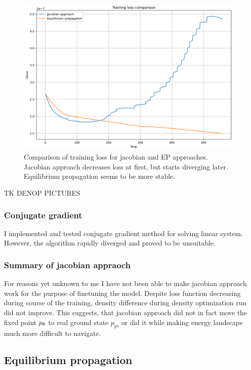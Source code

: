 \documentclass[a4paper,10pt]{report}
\begin{document}
\begin{figure}[h!]
 \centering
 \includegraphics[scale=0.5]{images/loss_comparison.png}
 \caption{Comparison of training loss for jacobian and EP approaches. Jacobian approach decreases loss at first, but starts diverging later. Equilibrium propagation seems to be more stable.}
 \label{fig:jac-eqprop-loss}
\end{figure}



TK DENOP PICTURES

\subsubsection{Conjugate gradient}
I implemented and tested conjugate gradient method for solving linear system. However, the algorithm rapidly diverged and proved to be unsuitable.
\subsubsection{Summary of jacobian appraoch}

 For reasons yet unknown to me I have not been able to make jacobian approach work for the purpose of finetuning the model. Despite loss function decreasing during course of the training, density difference during density optimization run did not improve. This suggests, that jacobian approach did not in fact move the fixed point $p_\theta$ to real ground state $p_{gs}$ or did it while making energy landscape much more difficult to navigate.


\subsection{ Equilibrium propagation}
\end{document}
